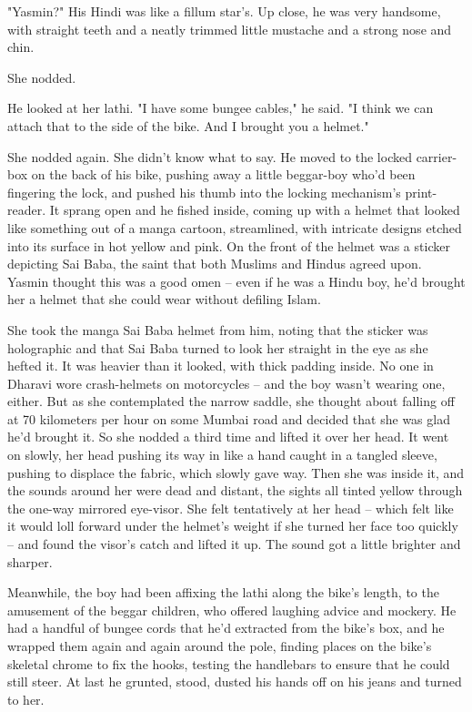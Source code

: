 "Yasmin?" His Hindi was like a fillum star's. Up close, he was very
handsome, with straight teeth and a neatly trimmed little mustache
and a strong nose and chin.

She nodded.

He looked at her lathi. "I have some bungee cables," he said. "I
think we can attach that to the side of the bike. And I brought you
a helmet."

She nodded again. She didn't know what to say. He moved to the
locked carrier-box on the back of his bike, pushing away a little
beggar-boy who'd been fingering the lock, and pushed his thumb into
the locking mechanism's print-reader. It sprang open and he fished
inside, coming up with a helmet that looked like something out of a
manga cartoon, streamlined, with intricate designs etched into its
surface in hot yellow and pink. On the front of the helmet was a
sticker depicting Sai Baba, the saint that both Muslims and Hindus
agreed upon. Yasmin thought this was a good omen -- even if he was
a Hindu boy, he'd brought her a helmet that she could wear without
defiling Islam.

She took the manga Sai Baba helmet from him, noting that the
sticker was holographic and that Sai Baba turned to look her
straight in the eye as she hefted it. It was heavier than it
looked, with thick padding inside. No one in Dharavi wore
crash-helmets on motorcycles -- and the boy wasn't wearing one,
either. But as she contemplated the narrow saddle, she thought
about falling off at 70 kilometers per hour on some Mumbai road and
decided that she was glad he'd brought it. So she nodded a third
time and lifted it over her head. It went on slowly, her head
pushing its way in like a hand caught in a tangled sleeve, pushing
to displace the fabric, which slowly gave way. Then she was inside
it, and the sounds around her were dead and distant, the sights all
tinted yellow through the one-way mirrored eye-visor. She felt
tentatively at her head -- which felt like it would loll forward
under the helmet's weight if she turned her face too quickly -- and
found the visor's catch and lifted it up. The sound got a little
brighter and sharper.

Meanwhile, the boy had been affixing the lathi along the bike's
length, to the amusement of the beggar children, who offered
laughing advice and mockery. He had a handful of bungee cords that
he'd extracted from the bike's box, and he wrapped them again and
again around the pole, finding places on the bike's skeletal chrome
to fix the hooks, testing the handlebars to ensure that he could
still steer. At last he grunted, stood, dusted his hands off on his
jeans and turned to her.

